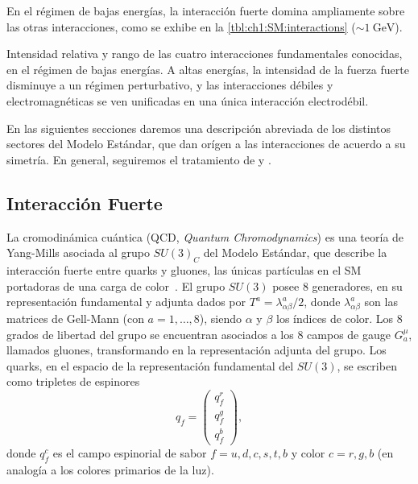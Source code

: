 En el régimen de bajas energías, la interacción fuerte domina ampliamente sobre las otras interacciones, como se exhibe en la \cref{tbl:ch1:SM:interactions} ($\sim \SI{1}{\GeV}$).

\begin{margintable}
  \setlength{\tabcolsep}{1.2mm}
  
  \caption{Intensidad relativa y rango de las cuatro interacciones fundamentales conocidas, en el régimen de bajas energías. A altas energías, la intensidad de la fuerza fuerte disminuye a un régimen perturbativo, y las interacciones débiles y electromagnéticas se ven unificadas en una única interacción electrodébil.}
  \label{tbl:ch1:SM:interactions}
\end{margintable}

En las siguientes secciones daremos una descripción abreviada de los distintos sectores del Modelo Estándar, que dan orígen a las interacciones de acuerdo a su simetría. En general, seguiremos el tratamiento de \cite{Schwartz2014} y \cite{Peskin2015}.




\subsection{Interacción Fuerte} \label{sec:ch1:SM:QCD}

La cromodinámica cuántica (QCD, \textit{Quantum Chromodynamics}) es una teoría de Yang-Mills asociada al grupo $SU(3)_C$ del Modelo Estándar, que describe la interacción fuerte entre quarks y gluones, las únicas partículas en el SM portadoras de una carga de color~\cite{Mangano:454171}. El grupo $SU(3)$ posee 8 generadores, en su representación fundamental y adjunta dados por $T^a = \lambda^a_{\alpha\beta}/2$, donde $\lambda^a_{\alpha\beta}$ son las matrices de Gell-Mann (con $a = 1, \dots, 8$), siendo $\alpha$ y $\beta$ los índices de color. Los 8 grados de libertad del grupo se encuentran asociados a los 8 campos de gauge $G^\mu_a$, llamados gluones, transformando en la representación adjunta del grupo. Los quarks, en el espacio de la representación fundamental del $SU(3)$, se escriben como tripletes de espinores
\[ q_f = \begin{pmatrix} q_f^r \\ q_f^g \\ q_f^b \end{pmatrix}, \]
donde $q_f^c$ es el campo espinorial de sabor $f = u, d, c, s, t, b$ y color $c = r, g, b$ (en analogía a los colores primarios de la luz).


